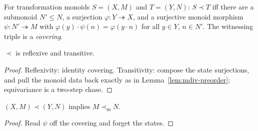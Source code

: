 \begin{definition}\label{def:sdiv}
  \leanok
  For transformation monoids $S = (X, M)$ and $T = (Y, N)$:
  $S \prec T$ iff there are a submonoid $N' \le N$, a surjection
  $\varphi : Y \twoheadrightarrow X$, and a surjective monoid morphism
  $\psi : N' \twoheadrightarrow M$ with
  $\varphi(y) \cdot \psi(n) = \varphi(y \cdot n)$ for all $y \in Y$,
  $n \in N'$. The witnessing triple is a \emph{covering}.
\end{definition}

\begin{lemma}[Preorder]\label{lem:sdiv-preorder}
  \leanok
  $\prec$ is reflexive and transitive.
\end{lemma}
\begin{proof}
  \leanok
  Reflexivity: identity covering. Transitivity: compose the state
  surjections, and pull the monoid data back exactly as in
  Lemma~\ref{lem:mdiv-preorder}; equivariance is a two-step chase.
\end{proof}

\begin{lemma}[Glue]\label{lem:sdiv-mdiv}
  \leanok
  $(X, M) \prec (Y, N)$ implies $M \prec_{\mathrm m} N$.
\end{lemma}
\begin{proof}
  \leanok
  Read $\psi$ off the covering and forget the states.
\end{proof}
